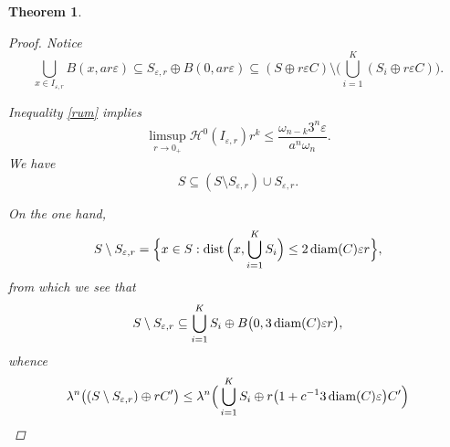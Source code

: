 \documentclass[pdflatex,sn-mathphys-num]{sn-jnl}
\theoremstyle{plain}
\newtheorem{theorem}{Theorem}[section]
\theoremstyle{definition}
\DeclareMathOperator{\dist}{\textup{dist}}
\DeclareMathOperator{\diam}{\textup{diam}}
\begin{document}
\begin{theorem}
\begin{proof}
Notice
\[
\bigcup_{x\in I_{\varepsilon, r}} B(x, ar\varepsilon)\subseteq S_{\varepsilon, r}\oplus B(0, ar\varepsilon) \subseteq (S\oplus r\varepsilon C) \setminus \Big(\bigcup_{i=1}^K (S_i\oplus r\varepsilon C)\Big).
\]

Inequality \eqref{rum} implies
\begin{equation}\label{limsup}\limsup_{r\to0_+}\mathcal{H}^0(I_{\varepsilon, r}) r^{k}\leq \frac{\omega_{n-k}3^n\varepsilon}{a^n\omega_n}.
\end{equation}
We have $$S\subseteq (S\setminus S_{\varepsilon, r})\cup S_{\varepsilon, r}.$$

On the one hand,
\[
S\setminus S_{\varepsilon, r}=\Big\{x\in S : \dist\Big(x, \bigcup_{i=1} ^K S_i\Big)\leq 2\diam(C)\varepsilon r\Big\},
\]
from which we see that $$S\setminus S_{\varepsilon, r}\subseteq\bigcup_{i=1}^K S_i\oplus B\big(0, 3\diam(C)\varepsilon r\big),$$ whence \begin{equation}\label{limsup2}
    \begin{split}
        \lambda^n\big((S\setminus S_{\varepsilon, r})\oplus rC^{\prime}\big)\leq \lambda^n\Big(\bigcup_{i=1}^K S_i\oplus r\big(1+c^{-1}3\diam(C)\varepsilon\big)C^{\prime}\Big)
    \end{split}
\end{equation}


\end{proof}
\end{theorem}
\end{document}
